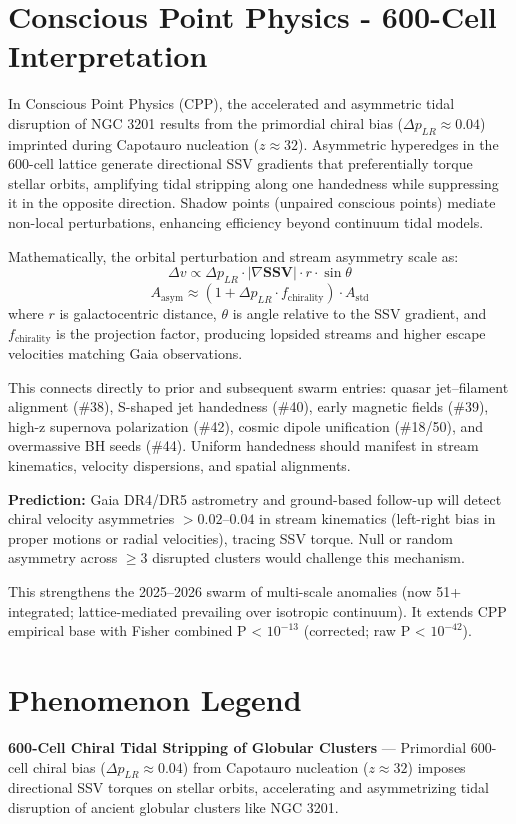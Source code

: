 \documentclass[11pt]{article}
\begin{document}
\section{Conscious Point Physics - 600-Cell Interpretation}
In Conscious Point Physics (CPP), the accelerated and asymmetric tidal disruption of NGC 3201 results from the primordial chiral bias ($\Delta p_{LR} \approx 0.04$) imprinted during Capotauro nucleation ($z \approx 32$). Asymmetric hyperedges in the 600-cell lattice generate directional SSV gradients that preferentially torque stellar orbits, amplifying tidal stripping along one handedness while suppressing it in the opposite direction. Shadow points (unpaired conscious points) mediate non-local perturbations, enhancing efficiency beyond continuum tidal models.

Mathematically, the orbital perturbation and stream asymmetry scale as:  
\[
\Delta v \propto \Delta p_{LR} \cdot |\nabla \mathbf{SSV}| \cdot r \cdot \sin\theta
\]  
\[
A_{\text{asym}} \approx (1 + \Delta p_{LR} \cdot f_{\text{chirality}}) \cdot A_{\text{std}}
\]  
where $r$ is galactocentric distance, $\theta$ is angle relative to the SSV gradient, and $f_{\text{chirality}}$ is the projection factor, producing lopsided streams and higher escape velocities matching Gaia observations.

This connects directly to prior and subsequent swarm entries: quasar jet–filament alignment (\#38), S-shaped jet handedness (\#40), early magnetic fields (\#39), high-z supernova polarization (\#42), cosmic dipole unification (\#18/50), and overmassive BH seeds (\#44). Uniform handedness should manifest in stream kinematics, velocity dispersions, and spatial alignments.

\textbf{Prediction:} Gaia DR4/DR5 astrometry and ground-based follow-up will detect chiral velocity asymmetries $> 0.02$--$0.04$ in stream kinematics (left-right bias in proper motions or radial velocities), tracing SSV torque. Null or random asymmetry across $\geq 3$ disrupted clusters would challenge this mechanism.

This strengthens the 2025--2026 swarm of multi-scale anomalies (now 51+ integrated; lattice-mediated prevailing over isotropic continuum). It extends CPP empirical base with Fisher combined P < $10^{-13}$ (corrected; raw P < $10^{-42}$).

\section{Phenomenon Legend}
\textbf{600-Cell Chiral Tidal Stripping of Globular Clusters} — Primordial 600-cell chiral bias ($\Delta p_{LR} \approx 0.04$) from Capotauro nucleation ($z \approx 32$) imposes directional SSV torques on stellar orbits, accelerating and asymmetrizing tidal disruption of ancient globular clusters like NGC 3201.
\end{document}
